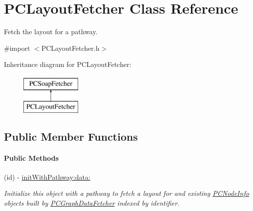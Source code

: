 \hypertarget{interface_p_c_layout_fetcher}{
\section{PCLayoutFetcher Class Reference}
\label{interface_p_c_layout_fetcher}
}


Fetch the layout for a pathway.  




{\ttfamily \#import $<$PCLayoutFetcher.h$>$}

Inheritance diagram for PCLayoutFetcher:\begin{figure}[h!]
\begin{center}
\leavevmode
\includegraphics[height=2.000000cm]{kegg_doc/interface_p_c_layout_fetcher}
\end{center}
\end{figure}
\subsection*{Public Member Functions}
\begin{Indent}\paragraph*{Public Methods}
\begin{DoxyCompactItemize}
\item 
\hypertarget{interface_p_c_layout_fetcher_a4d488df636f17330cdd3894c47b9f88e}{
(id) -\/ \hyperlink{interface_p_c_layout_fetcher_a4d488df636f17330cdd3894c47b9f88e}{initWithPathway:data:}}
\label{interface_p_c_layout_fetcher_a4d488df636f17330cdd3894c47b9f88e}

\begin{DoxyCompactList}\small\item\em Initialize this object with a pathway to fetch a layout for and existing \hyperlink{interface_p_c_node_info}{PCNodeInfo} objects built by \hyperlink{interface_p_c_graph_data_fetcher}{PCGraphDataFetcher} indexed by identifier. \end{DoxyCompactList}\end{DoxyCompactItemize}
\end{Indent}
